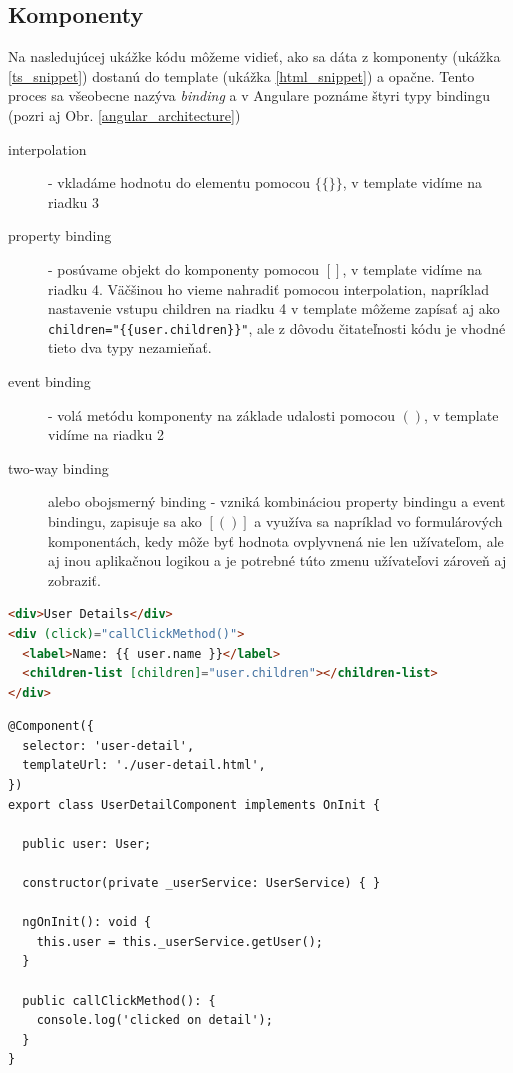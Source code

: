 \documentclass[
  digital, %
  twoside, %
  notable,   %
  nolof,   %
  nolot,   %
]{fithesis3}
\begin{document}
\subsection{Komponenty}
Na nasledujúcej ukážke kódu môžeme vidieť, ako sa dáta z komponenty (ukážka \ref{ts_snippet}) dostanú do template (ukážka \ref{html_snippet}) a opačne. Tento proces sa všeobecne nazýva \textit{binding} a v Angulare poznáme štyri typy bindingu (pozri aj Obr. \ref{angular_architecture})
\begin{description}
\item[interpolation] - vkladáme hodnotu do elementu pomocou $\{\{\}\}$, v template vidíme na riadku 3
\item[property binding] - posúvame objekt do komponenty pomocou $[ ]$, v template vidíme na riadku 4. Väčšinou ho vieme nahradiť pomocou interpolation, napríklad nastavenie vstupu children na riadku 4 v template môžeme zapísať aj ako\\
\texttt{children="\{\{user.children\}\}"}, ale z dôvodu čitateľnosti kódu je vhodné tieto dva typy nezamieňať.
\item[event binding] - volá metódu komponenty na základe udalosti pomocou $()$, v template vidíme na riadku 2
\item[two-way binding] alebo obojsmerný binding - vzniká kombináciou property bindingu a event bindingu, zapisuje sa ako $[( )]$ a využíva sa napríklad vo formulárových komponentách, kedy môže byť hodnota ovplyvnená nie len užívateľom, ale aj inou aplikačnou logikou a je potrebné túto zmenu užívateľovi zároveň aj zobraziť.
\end{description}

\begin{lstlisting}[language=HTML,caption={HTML template \textit{user-detail.html}},captionpos=b,label=html_snippet]
<div>User Details</div>
<div (click)="callClickMethod()">
  <label>Name: {{ user.name }}</label>
  <children-list [children]="user.children"></children-list>
</div>
\end{lstlisting}

\begin{lstlisting}[caption={Komponenta UserDetail},captionpos=b,label=ts_snippet]
@Component({
  selector: 'user-detail',
  templateUrl: './user-detail.html',
})
export class UserDetailComponent implements OnInit {

  public user: User;

  constructor(private _userService: UserService) { }

  ngOnInit(): void {
    this.user = this._userService.getUser();
  }
  
  public callClickMethod(): {
    console.log('clicked on detail');
  }
}
\end{lstlisting}
\end{document}
